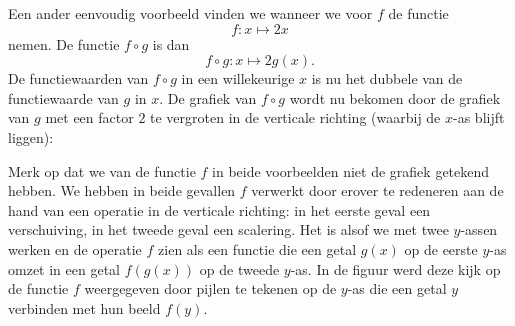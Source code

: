 \documentclass{ximera}
\begin{document}
Een ander eenvoudig voorbeeld vinden we wanneer we voor $f$ de functie
\[
f:x\mapsto 2x
\]
nemen.
De functie $f\circ g$ is dan
\[
f\circ g: x\mapsto 2 g(x).
\]
De functiewaarden van $f\circ g$ in een willekeurige $x$ is nu het
dubbele van de functiewaarde van $g$ in $x$. De grafiek van $f\circ g$
wordt nu bekomen door de grafiek van $g$ met een factor $2$ te
vergroten in de verticale richting (waarbij de $x$-as blijft liggen):

\begin{center}
\end{center}


Merk op dat we van de functie $f$ in beide voorbeelden niet de grafiek
getekend hebben. We hebben in beide gevallen $f$ verwerkt door erover
te redeneren aan de hand van een operatie in de verticale richting: in
het eerste geval een verschuiving, in het tweede geval een
scalering. Het is alsof we met twee $y$-assen werken en de operatie $f$
zien als een functie die een getal $g(x)$ op de eerste $y$-as omzet in
een getal $f(g(x))$ op de tweede $y$-as. In de figuur werd deze
kijk op de functie $f$ weergegeven door pijlen te tekenen op de $y$-as
die een getal $y$ verbinden met hun beeld $f(y)$.
\end{document}
